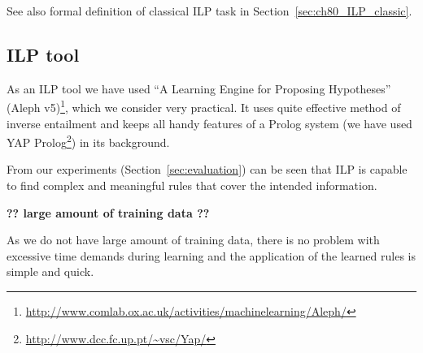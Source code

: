 See also formal definition of classical ILP task in Section~\ref{sec:ch80_ILP_classic}.

\subsection{ILP tool}
As an ILP tool we have used ``A Learning Engine for Proposing Hypotheses'' (Aleph v5)\footnote{\url{http://www.comlab.ox.ac.uk/activities/machinelearning/Aleph/}}, which we consider very practical. It uses quite effective method of inverse entailment \citep{biblio:InverseEntailment} and keeps all handy features of a Prolog system (we have used YAP Prolog\footnote{\url{http://www.dcc.fc.up.pt/~vsc/Yap/}}) in its background.


From our experiments (Section~\ref{sec:evaluation}) can be seen that ILP is capable to find complex and meaningful rules that cover the intended information.



\textbf{?? large amount of training data ??}

As we do not have large amount of training data, there is no problem with excessive time demands during learning and the application of the learned rules is simple and quick.



